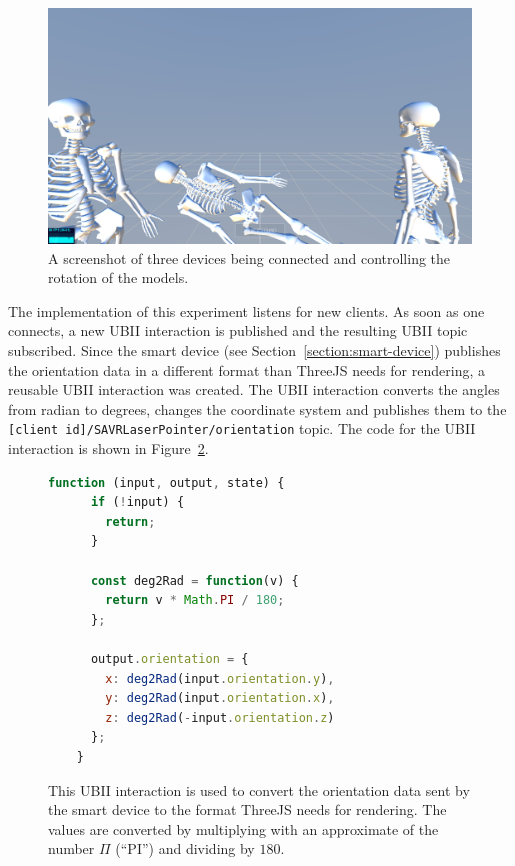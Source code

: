 \begin{figure}[H]
  \centering
  \includegraphics[width=12cm]{figures/implementation/screenshot_exp_mv.png}
  \caption[Screenshot of the model viewer experiment]{A screenshot of three devices being connected and controlling the rotation of the models.}\label{fig:screenshot-exp-mv}
\end{figure}

The implementation of this experiment listens for new clients. As soon as one connects, a new \ac{UBII} interaction is published and the resulting \ac{UBII} topic subscribed. Since the smart device (see Section~\ref{section:smart-device}) publishes the orientation data in a different format than ThreeJS needs for rendering, a reusable \ac{UBII} interaction was created. The \ac{UBII} interaction converts the angles from radian to degrees, changes the coordinate system and publishes them to the \lstinline[breaklines=false]{[client id]/SAVRLaserPointer/orientation} topic. The code for the \ac{UBII} interaction is shown in Figure~\ref{fig:ubii-interaction-angles}.

\begin{figure}[H]
  \begin{lstlisting}[language=JavaScript]
    function (input, output, state) {
      if (!input) {
        return;
      }

      const deg2Rad = function(v) {
        return v * Math.PI / 180;
      };

      output.orientation = {
        x: deg2Rad(input.orientation.y),
        y: deg2Rad(input.orientation.x),
        z: deg2Rad(-input.orientation.z)
      };
    }
  \end{lstlisting}
  \caption[UBII interaction of model viewer]{This \ac{UBII} interaction is used to convert the orientation data sent by the smart device to the format ThreeJS needs for rendering. The values are converted by multiplying with an approximate of the number $\Pi$ (\enquote{PI}) and dividing by $180$.}\label{fig:ubii-interaction-angles} %
\end{figure}

